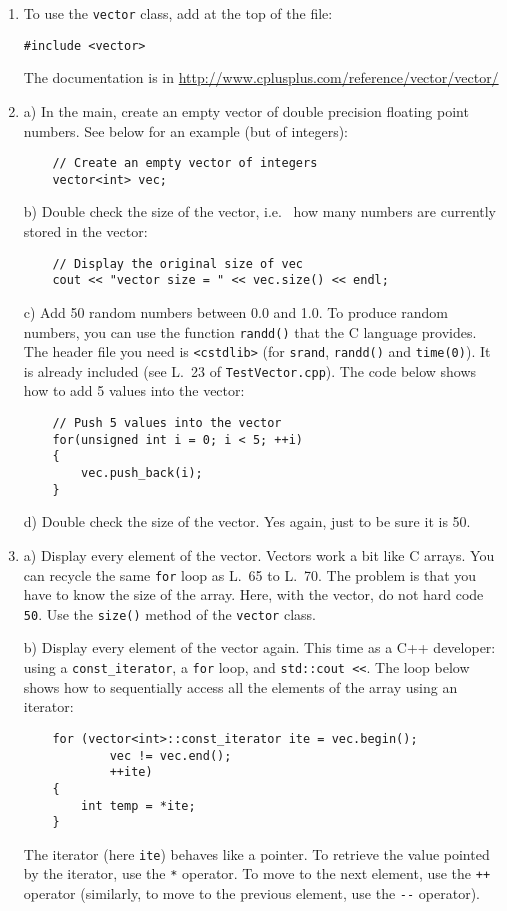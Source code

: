 \begin{enumerate}

\item To use the \verb+vector+ class, add at the top of the file:
\begin{lstlisting}
#include <vector>
\end{lstlisting}
The documentation is in \url{http://www.cplusplus.com/reference/vector/vector/}

\item a) In the main, create an empty vector of double precision floating point numbers. See below for an example (but of integers):
\begin{lstlisting}
    // Create an empty vector of integers
    vector<int> vec;
\end{lstlisting}

 b) Double check the size of the vector, i.e.~ how many numbers are currently stored in the vector:
\begin{lstlisting}
    // Display the original size of vec
    cout << "vector size = " << vec.size() << endl;
\end{lstlisting}

c) Add 50 random numbers between 0.0 and 1.0. 
To produce random numbers, you can use the function \verb+randd()+ that the C language provides. The header file you need is \verb+<cstdlib>+ (for \verb+srand+, \verb+randd()+ and \verb+time(0)+). 
It is already included (see L.~23 of \verb+TestVector.cpp+).
The code below shows how to add 5 values into the vector:
\begin{lstlisting}
    // Push 5 values into the vector
    for(unsigned int i = 0; i < 5; ++i)
    {
        vec.push_back(i);
    }
\end{lstlisting}

d) Double check the size of the vector. Yes again, just to be sure it is 50.

\item a) Display every element of the vector. 
Vectors work a bit like C arrays. 
You can recycle the same \verb+for+ loop as L.~65 to L.~70. 
The problem is that you have to know the size of the array. 
Here, with the vector, do not hard code \verb+50+. 
Use the \verb+size()+ method of the \verb+vector+ class. 

b) Display every element of the vector again. 
This time as a C++ developer: 
using a \verb+const_iterator+, a \verb+for+ loop, and \verb+std::cout <<+. 
The loop below shows how to sequentially access all the elements of the array using an iterator:
\begin{lstlisting}
    for (vector<int>::const_iterator ite = vec.begin();
            vec != vec.end();
            ++ite)
    {
        int temp = *ite;
    }
\end{lstlisting}
The iterator (here \verb+ite+) behaves like a pointer. 
To retrieve the value pointed by the iterator, use the \verb+*+ operator. 
To move to the next element, use the \verb!++! operator
(similarly, to move to the previous element, use the \verb!--! operator). 



\end{enumerate}
